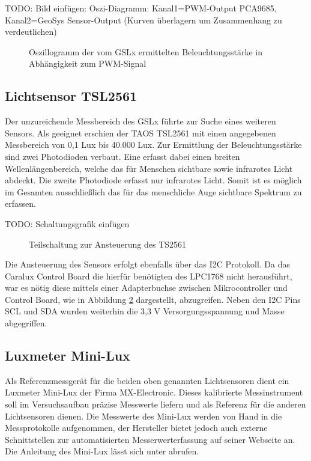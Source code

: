 \documentclass[a4paper,12pt]{scrartcl}
\begin{document}
TODO: Bild einf\"ugen: Oszi-Diagramm: Kanal1=PWM-Output PCA9685, Kanal2=GeoSys Sensor-Output (Kurven \"uberlagern um Zusammenhang zu verdeutlichen)

\begin{figure}[htb]
\begin{center}
\end{center}
\caption[Oszillogramm der vom GSLx ermittelten Beleuchtungsstärke in Abhängigkeit zum PWM-Signal, Quelle: Autoren]{\label{fig:gslOszi}Oszillogramm der vom GSLx ermittelten Beleuchtungsstärke in Abhängigkeit zum PWM-Signal}
\end{figure}

\subsection{Lichtsensor TSL2561}

Der unzureichende Messbereich des GSLx führte zur Suche eines weiteren Sensors. Als geeignet erschien der TAOS TSL2561 mit einen angegebenen Messbereich von 0,1 Lux bis 40.000 Lux. Zur Ermittlung der Beleuchtungsstärke sind zwei Photodioden verbaut. Eine erfasst dabei einen breiten Wellenlängenbereich, welche das für Menschen sichtbare sowie infrarotes Licht abdeckt. Die zweite Photodiode erfasst nur infrarotes Licht. Somit ist es möglich im Gesamten ausschließlich das für das menschliche Auge sichtbare Spektrum zu erfassen.

TODO: Schaltungsgrafik einfügen

\begin{figure}[htb]
\begin{center}
\end{center}
\caption[Teilschaltung zur Ansteuerung des TS2561, Quelle: Autoren]{\label{fig:schaltungTSL}Teilschaltung zur Ansteuerung des TS2561}
\end{figure}

Die Ansteuerung des Sensors erfolgt ebenfalls über das I2C Protokoll. Da das Caralux Control Board die hierfür benötigten des LPC1768 nicht herausführt, war es nötig diese mittels einer Adapterbuchse zwischen Mikrocontroller und Control Board, wie in Abbildung \ref{fig:schaltungTSL} dargestellt, abzugreifen. Neben den I2C Pins SCL und SDA wurden weiterhin die 3,3 V Versorgungsspannung und Masse abgegriffen.

\subsection{Luxmeter Mini-Lux}
Als Referenzmessgerät für die beiden oben genannten Lichtsensoren dient ein Luxmeter Mini-Lux der Firma MX-Electronic. Dieses kalibrierte Messinstrument soll
im Versuchsaufbau präzise Messwerte liefern und als Referenz für die anderen Lichtsensoren dienen. Die Messwerte des Mini-Lux werden von Hand in die
Messprotokolle aufgenommen, der Hersteller bietet jedoch auch externe Schnittstellen zur automatisierten Messerwerterfassung auf seiner Webseite an. Die
Anleitung des Mini-Lux lässt sich unter \cite{specminilux} abrufen. 
\end{document}
